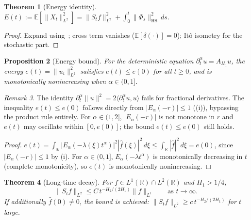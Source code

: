 \documentclass[11pt]{article}
\newtheorem{theorem}{Theorem}[section]
\newtheorem{proposition}[theorem]{Proposition}
\theoremstyle{definition}
\theoremstyle{remark}
\newtheorem{remark}[theorem]{Remark}
\newcommand{\E}{\mathbb{E}}
\newcommand{\R}{\mathbb{R}}
\newcommand{\ip}[2]{\langle #1, #2 \rangle}
\newcommand{\norm}[1]{\| #1 \|}
\begin{document}
\begin{theorem}[Energy identity]\label{thm:energy}
$E(t) := \E[\norm{X_t}_{L^2}^2] = \norm{S_t f}_{L^2}^2 + \int_0^t \norm{\Phi_s}_{\mathrm{HS}}^2\, ds$.
\end{theorem}

\begin{proof}
Expand using~; cross term vanishes ($\E[\delta(\cdot)] = 0$); It\^o isometry for the stochastic part.
\end{proof}

\begin{proposition}[Energy bound]\label{prop:dissipation}
For the deterministic equation $\partial_t^\alpha u = A_{H_1} u$, the energy $e(t) = \norm{u_t}_{L^2}^2$ satisfies $e(t) \leq e(0)$ for all $t \geq 0$, and is monotonically nonincreasing when $\alpha \in (0, 1]$.
\end{proposition}

\begin{remark}\label{rem:energy_inequality}
The identity $\partial_t^\alpha \norm{u}^2 = 2\ip{\partial_t^\alpha u}{u}$ fails for fractional derivatives.  The inequality $e(t) \leq e(0)$ follows directly from $|E_\alpha(-r)| \leq 1$ ((i)), bypassing the product rule entirely.  For $\alpha \in (1, 2]$, $|E_\alpha(-r)|$ is not monotone in $r$ and $e(t)$ may oscillate within $[0, e(0)]$; the bound $e(t) \leq e(0)$ still holds.
\end{remark}

\begin{proof}
$e(t) = \int_\R |E_\alpha(-\lambda(\xi) t^\alpha)|^2 |\hat{f}(\xi)|^2\, d\xi \leq \int_\R |\hat{f}|^2\, d\xi = e(0)$, since $|E_\alpha(-r)| \leq 1$ by (i).  For $\alpha \in (0, 1]$, $E_\alpha(-\lambda t^\alpha)$ is monotonically decreasing in $t$ (complete monotonicity), so $e(t)$ is monotonically nonincreasing.
\end{proof}

\begin{theorem}[Long-time decay]\label{thm:decay_det}
For $f \in L^1(\R) \cap L^2(\R)$ and $H_1 > 1/4$,
\begin{equation}\label{eq:decay}
\norm{S_t f}_{L^2} \leq C\,t^{-H_2/(2H_1)}
\norm{f}_{L^1} \qquad \text{as } t \to \infty.
\end{equation}
If additionally $\hat{f}(0) \neq 0$, the bound is
achieved: $\norm{S_t f}_{L^2} \geq c\,t^{-H_2/(2H_1)}$
for $t$ large.
\end{theorem}
\end{document}
